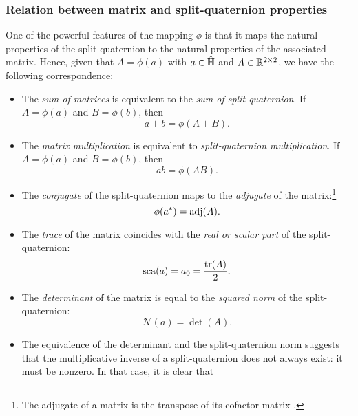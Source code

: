 \subsubsection{Relation between matrix and split-quaternion properties} 
One of the powerful features of the mapping \(\phi\) is that it maps the natural properties of the split-quaternion to the natural properties of the associated matrix. Hence, given that \(A = \phi(a)\) with \(a \in \hat{\mathbb{H}}\) and \(A \in \mathbb{R}^{2\times2}\), we have the following correspondence: 
\begin{itemize}
    \item The \emph{sum of matrices} is equivalent to the \emph{sum of split-quaternion}. If \(A = \phi(a)\) and \(B = \phi(b)\), then
        \begin{equation}
            a + b = \phi(A + B).
        \end{equation}
    \item The \emph{matrix multiplication} is equivalent to \emph{split-quaternion multiplication}. If \(A = \phi(a)\) and \(B = \phi(b)\), then
        \begin{equation}
             ab = \phi(AB).
        \end{equation}
    \item The \emph{conjugate} of the split-quaternion maps to the \emph{adjugate} of the matrix:\footnote
        {The adjugate of a matrix is the transpose of its cofactor matrix \cite{Verhaegen2007}.}
        \begin{equation}
             \phi(a^*) = \operatorname{adj}(A).
        \end{equation}
    \item The \emph{trace} of the matrix coincides with the \emph{real or scalar part} of the split-quaternion:
        \begin{equation}
             \scapart{a} = a_0 = \frac{\trace(A)}{2}.
        \end{equation}
    \item The \emph{determinant} of the matrix is equal to the \emph{squared norm} of the split-quaternion:
        \begin{equation}
             \mathscr{N}(a) = \det(A).
        \end{equation}
    \item The equivalence of the determinant and the split-quaternion norm suggests that the multiplicative inverse of a split-quaternion does not always exist: it must be nonzero. In that case, it is clear that
        \begin{equation}

\end{equation}
\end{itemize}
